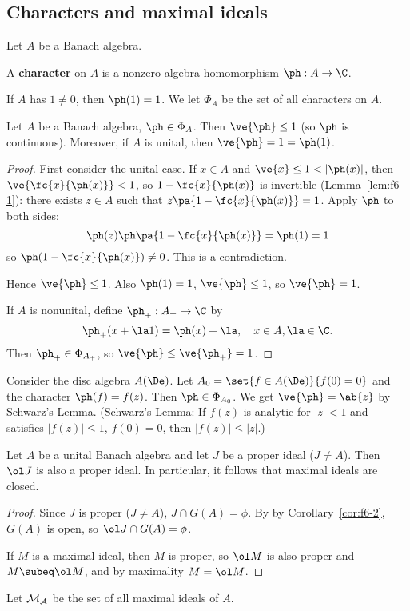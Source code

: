 \subsection{Characters and maximal ideals}
Let $A$ be a Banach algebra.
\begin{df}
A \textbf{character} on $A$ is a nonzero algebra homomorphism $\ph:A\to \C$.
\end{df}
If $A$ has $1\ne 0$, then $\ph(1)=1$. We let $\Phi_A$ be the set of all characters on $A$. 
\begin{lem}
Let $A$ be a Banach algebra, $\ph\in \Phi_A$. Then $\ve{\ph}\le1$ (so $\ph$ is continuous). Moreover, if $A$ is unital, then $\ve{\ph}=1=\ph(1)$.
\end{lem}
\begin{proof}
First consider the unital case. If $x\in A$ and $\ve{x}\le 1<|\ph(x)|$, then $\ve{\fc{x}{\ph(x)}}<1$, so $1-\fc{x}{\ph(x)}$ is invertible (Lemma~\ref{lem:f6-1}): there exists $z\in A$ such that $z\pa{1-\fc{x}{\ph(x)}}=1$. Apply $\ph$ to both sides:
\[
\ph(z)\ph\pa{
1-\fc{x}{\ph(x)}
}=\ph(1)=1
\]
so $\ph(1-\fc{x}{\ph(x)})\ne 0$. This is a contradiction.

Hence $\ve{\ph}\le 1$. Also $\ph(1)=1$, $\ve{\ph}\le 1$, so $\ve{\ph}=1$.

If $A$ is nonunital, define $\ph_+:A_+\to \C$ by 
\[
\ph_+(x+\la 1)=\ph(x)+\la, \quad x\in A,\la \in \C.
\]
Then $\ph_+\in \Phi_{A_+}$, so $\ve{\ph}\le \ve{\ph_+}= 1$.
\end{proof}
\begin{ex}
Consider the disc algebra $A(\De)$. Let $A_0=\set{f\in A(\De)}{f(0)=0}$ and the character $\ph(f)=f(z)$. Then $\ph\in \Phi_{A_0}$. We get $\ve{\ph}=\ab{z}$ by Schwarz's Lemma. (Schwarz's Lemma: If $f(z)$ is analytic for $|z|<1$ and satisfies $|f(z)|\le 1$, $f(0)=0$, then $|f(z)|\le |z|$.)
\end{ex}
\begin{lem}
Let $A$ be a unital Banach algebra and let $J$ be a proper ideal ($J\ne A$). Then $\ol J$ is also a proper ideal. In particular, it follows that maximal ideals are closed.
\end{lem}
\begin{proof}
Since $J$ is proper ($J\ne A$), $J\cap G(A)=\phi$. By by Corollary~\ref{cor:f6-2}, $G(A)$ is open, so $\ol J\cap G(A)=\phi$.

If $M$ is a maximal ideal, then $M$ is proper, so $\ol M$ is also proper and $M\subeq \ol M$, and by maximality $M=\ol M$. 
\end{proof}
Let $\cal M_A$ be the set of all maximal ideals of $A$.


